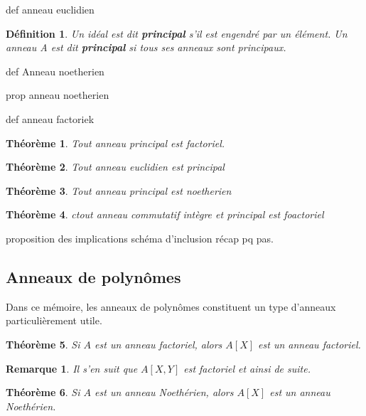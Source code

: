 \documentclass[a4paper,12pt]{report}  %
\theoremstyle{definitionstyle}
\newtheorem{definition}{Définition}[chapter] %
\theoremstyle{examplestyle}
\theoremstyle{remarkstyle}
\newtheorem{remark}{Remarque}[chapter] %
\theoremstyle{propositionstyle}
\theoremstyle{theoremstyle}
\newtheorem{theoreme}{Théorème}[chapter]  %
\begin{document}
	def anneau euclidien
	
	\begin{definition}
		Un idéal est dit \textbf{principal} s'il est engendré par un élément. Un anneau A est dit \textbf{principal} si tous ses anneaux sont principaux.
	\end{definition} 
	
		

	def Anneau noetherien
	
	prop anneau noetherien
	
	
	def anneau factoriek
	
	\begin{theoreme}
		Tout anneau principal est factoriel.
	\end{theoreme}
	
	
	\begin{theoreme}
		Tout anneau euclidien est principal
	\end{theoreme}
	
	\begin{theoreme}
		Tout anneau principal est noetherien
	\end{theoreme}
	
	
	\begin{theoreme}
		ctout anneau commutatif intègre et principal est foactoriel
	\end{theoreme}
	
	
	

	
	
	proposition des implications
	schéma d'inclusion récap pq pas.
	
	\subsection{Anneaux de polynômes}
	
	Dans ce mémoire, les anneaux de polynômes constituent un type d'anneaux particulièrement utile.
	
	\begin{theoreme}
	Si $A$ est un anneau factoriel, alors $A[X]$ est un anneau factoriel.
	\end{theoreme}

	\begin{remark}
		Il s'en suit que $A[X, Y]$ est factoriel et ainsi de suite.
	\end{remark}

	\begin{theoreme}
		Si $A$ est un anneau Noethérien, alors $A[X]$ est un anneau Noethérien.
	\end{theoreme}
	
\end{document}
